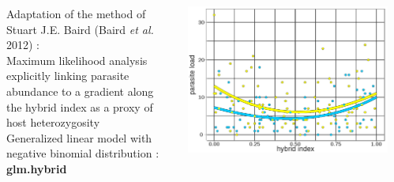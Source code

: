 \documentclass[30pt, a0paper, portrait, margin=0mm, innermargin=15mm,
               blockverticalspace=15mm, colspace=15mm, subcolspace=8mm]{tikzposter}
\begin{document}
\begin{columns}
{\begin{itemize}
      \end{itemize}
}







{

\vfill
  \item Adaptation of the method of Stuart J.E. Baird (Baird \textit{et al.} 2012) : \\ Maximum likelihood analysis explicitly linking parasite abundance to a gradient along the hybrid index as a proxy of host heterozygosity \\Generalized linear model with negative binomial distribution : \textbf{glm.hybrid} \vspace{+1ex}
   \begin{center}
  \includegraphics[scale=0.5]{model.png}


\end{center}}
\end{columns}
\end{document}
